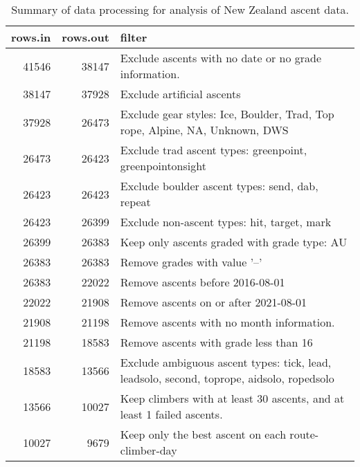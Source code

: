 \begin{table}[ht]
\centering
\begingroup\fontsize{9pt}{10pt}\selectfont
\begin{tabular}{r r p{11cm}}
  \hline
{\bf rows.in} & {\bf rows.out} & {\bf filter} \\ 
  \hline
41546 & 38147 & Exclude ascents with no date or no grade information. \\ 
  38147 & 37928 & Exclude artificial ascents \\ 
  37928 & 26473 & Exclude gear styles: Ice, Boulder, Trad, Top rope, Alpine, NA, Unknown, DWS \\ 
  26473 & 26423 & Exclude trad ascent types: greenpoint, greenpointonsight \\ 
  26423 & 26423 & Exclude boulder ascent types: send, dab, repeat \\ 
  26423 & 26399 & Exclude non-ascent types: hit, target, mark \\ 
  26399 & 26383 & Keep only ascents graded with grade type: AU \\ 
  26383 & 26383 & Remove grades with value '--' \\ 
  26383 & 22022 & Remove ascents before 2016-08-01 \\ 
  22022 & 21908 & Remove ascents on or after 2021-08-01 \\ 
  21908 & 21198 & Remove ascents with no month information. \\ 
  21198 & 18583 & Remove ascents with grade less than 16 \\ 
  18583 & 13566 & Exclude ambiguous ascent types: tick, lead, leadsolo, second, toprope, aidsolo, ropedsolo \\ 
  13566 & 10027 & Keep climbers with at least 30 ascents, and at least 1 failed ascents. \\ 
  10027 & 9679 & Keep only the best ascent on each route-climber-day \\ 
   \hline
\end{tabular}
\endgroup
\caption{Summary of data processing for analysis of New Zealand ascent data.} 
\label{table-data-processing-nz}
\end{table}
